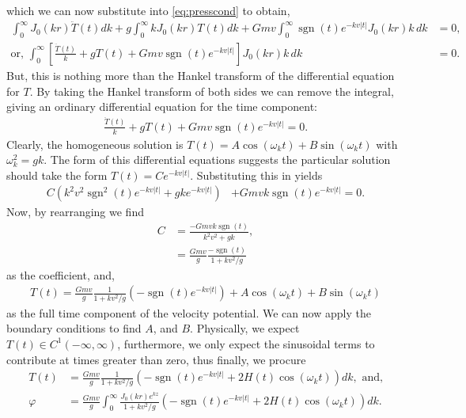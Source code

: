 \documentclass[12pt]{article}
\DeclareMathOperator{\sgn}{sgn}
\begin{document}
which we can now substitute into \eqref{eq:presscond} to obtain,
\begin{align*}
\int_0^\infty J_0(kr)  \ddot{T}(t) dk + g \int_0^\infty k J_0(kr) T(t) dk + Gmv \int_0^\infty \sgn(t) e^{-kv|t|} J_0(kr)k \, dk &= 0, \\
\text{or, } \int_0^\infty \left[ \frac{\ddot{T}(t)}{k} + gT(t) + Gmv \sgn(t) e^{-kv|t|} \right] J_0(kr) k \, dk &= 0.
\end{align*}
But, this is nothing more than the Hankel transform of the differential equation for $T$. By taking the Hankel transform of both sides we can remove the integral, giving an ordinary differential equation for the time component:
\begin{align*}
\frac{\ddot{T}(t)}{k} + gT(t) + Gmv \sgn(t) e^{-kv|t|} = 0.
\end{align*}
Clearly, the homogeneous solution is $T(t) = A \cos(\omega_k t) + B \sin(\omega_k t)$ with $\omega_k^2 = gk$. The form of this differential equations suggests the particular solution should take the form $T(t) = C e^{-kv|t|}$. Substituting this in yields
\begin{align*}
C \left(k^2 v^2 \sgn^2(t) e^{-kv |t|} + gk e^{-kv |t|} \right) &+ Gmvk \sgn(t) e^{-kv|t|} = 0.
\end{align*}
Now, by rearranging we find
\begin{align*}
C &= \frac{-Gmvk \sgn(t)}{k^2v^2 + gk}, \\
&= \frac{Gmv}{g} \frac{-\sgn(t)}{1+kv^2/g}
\end{align*}
as the coefficient, and,
\begin{align*}
T(t) = \frac{Gmv}{g} \frac{1}{1+kv^2/g} \left( -\sgn(t) e^{-kv|t|} \right) + A \cos(\omega_k t) + B \sin(\omega_k t)
\end{align*}
as the full time component of the velocity potential. We can now apply the boundary conditions to find $A$, and $B$. Physically, we expect $T(t) \in C^1(-\infty,\infty)$, furthermore, we only expect the sinusoidal terms to contribute at times greater than zero, thus finally, we procure
\begin{align*}
T(t) &= \frac{Gmv}{g}\frac{1}{1+kv^2/g} \left(-\sgn(t)e^{-kv|t|} + 2H(t)\cos(\omega_k t) \right)dk, \text{ and,} \\
\varphi &= \frac{Gmv}{g} \int_0^\infty \frac{J_0(kr)e^{kz}}{1+kv^2/g} \left(-\sgn(t)e^{-kv|t|} + 2H(t)\cos(\omega_k t) \right) dk.
\end{align*}
\end{document}
